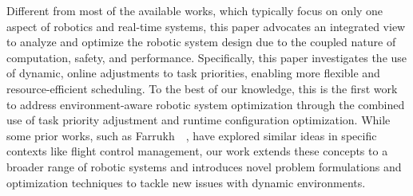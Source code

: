     Different from most of the available works, which typically focus on only one aspect of robotics and real-time systems, this paper advocates an integrated view to analyze and optimize the robotic system design due to the coupled nature of computation, safety, and performance.
    Specifically, this paper investigates the use of dynamic, online adjustments to task priorities, enabling more flexible and resource-efficient scheduling. To the best of our knowledge, this is the first work to address environment-aware robotic system optimization through the combined use of task priority adjustment and runtime configuration optimization. While some prior works, such as Farrukh~\etal~\cite{Farrukh2020}, have explored similar ideas in specific contexts like flight control management, our work extends these concepts to a broader range of robotic systems and introduces novel problem formulations and optimization techniques to tackle new issues with dynamic environments.
	
	
